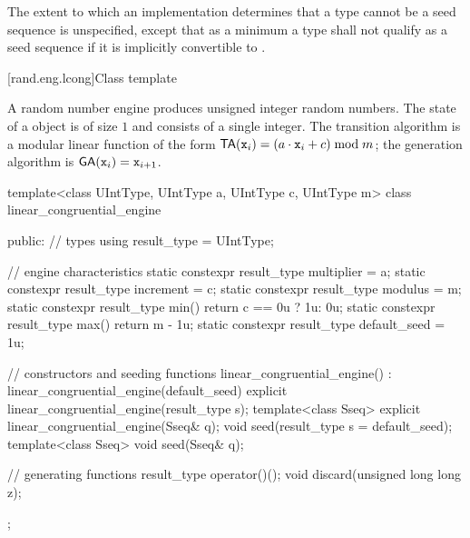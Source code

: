 The extent to which an implementation determines that a type cannot be a seed sequence
is unspecified, except that as a minimum a type shall not qualify as a seed sequence
if it is implicitly convertible to .


[rand.eng.lcong]{Class template }%
%

\pnum
A  random number engine
produces unsigned integer random numbers.
The state%
of a  object 
is of size $1$
and consists of a single integer.
The transition algorithm%
%
is a modular linear function of the form
$\mathsf{TA}(\texttt{x}_{i}) = (a \cdot \texttt{x}_{i} + c) \bmod m$;
the generation algorithm%
%
is $\mathsf{GA}(\texttt{x}_{i}) = \texttt{x}_{i+1}$.

%
%
\begin{codeblock}
template<class UIntType, UIntType a, UIntType c, UIntType m>
  class linear_congruential_engine {
  public:
    // types
    using result_type = UIntType;

    // engine characteristics
    static constexpr result_type multiplier = a;
    static constexpr result_type increment = c;
    static constexpr result_type modulus = m;
    static constexpr result_type min() { return c == 0u ? 1u: 0u; }
    static constexpr result_type max() { return m - 1u; }
    static constexpr result_type default_seed = 1u;

    // constructors and seeding functions
    linear_congruential_engine() : linear_congruential_engine(default_seed) {}
    explicit linear_congruential_engine(result_type s);
    template<class Sseq> explicit linear_congruential_engine(Sseq& q);
    void seed(result_type s = default_seed);
    template<class Sseq> void seed(Sseq& q);

    // generating functions
    result_type operator()();
    void discard(unsigned long long z);
  };
\end{codeblock}

